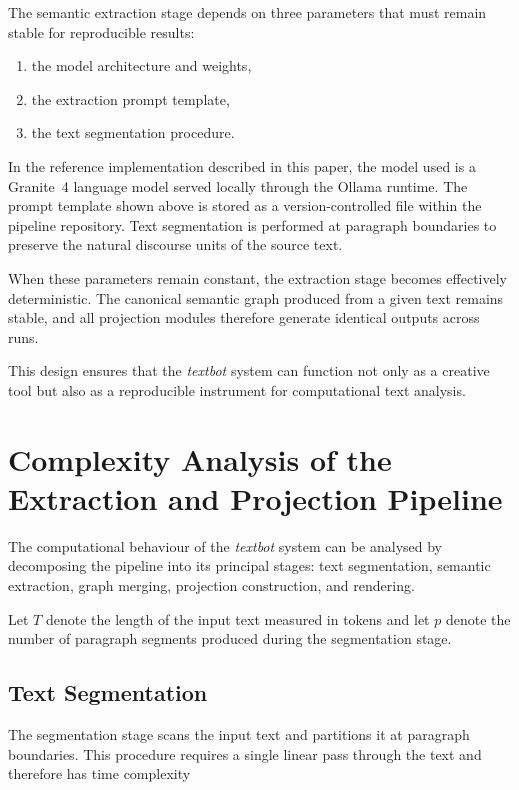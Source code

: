 \documentclass[12pt, a4paper]{article}
\begin{document}
The semantic extraction stage depends on three parameters that must remain stable for reproducible results:

\begin{enumerate}
\item the model architecture and weights,
\item the extraction prompt template,
\item the text segmentation procedure.
\end{enumerate}

In the reference implementation described in this paper, the model used is a Granite~4 language model served locally through the Ollama runtime. The prompt template shown above is stored as a version-controlled file within the pipeline repository. Text segmentation is performed at paragraph boundaries to preserve the natural discourse units of the source text.

When these parameters remain constant, the extraction stage becomes effectively deterministic. The canonical semantic graph produced from a given text remains stable, and all projection modules therefore generate identical outputs across runs.

This design ensures that the \textit{textbot} system can function not only as a creative tool but also as a reproducible instrument for computational text analysis.

\section{Complexity Analysis of the Extraction and Projection Pipeline}

The computational behaviour of the \textit{textbot} system can be analysed by decomposing the pipeline into its principal stages: text segmentation, semantic extraction, graph merging, projection construction, and rendering.

Let $T$ denote the length of the input text measured in tokens and let $p$ denote the number of paragraph segments produced during the segmentation stage.

\subsection{Text Segmentation}

The segmentation stage scans the input text and partitions it at paragraph boundaries. This procedure requires a single linear pass through the text and therefore has time complexity
\end{document}
